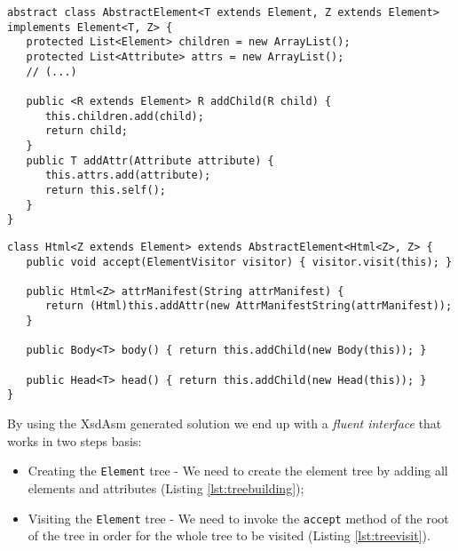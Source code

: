 \bigskip


\begin{minipage}{\linewidth}
\begin{lstlisting}[caption={AbstractElement generated by XsdAsm},label={lst:abstractelementasm}]
abstract class AbstractElement<T extends Element, Z extends Element> implements Element<T, Z> {
   protected List<Element> children = new ArrayList();
   protected List<Attribute> attrs = new ArrayList();
   // (...)

   public <R extends Element> R addChild(R child) {
      this.children.add(child);
      return child;
   }
   public T addAttr(Attribute attribute) {
      this.attrs.add(attribute);
      return this.self();
   }
}
\end{lstlisting}
\end{minipage}

\bigskip


\begin{minipage}{\linewidth}
\begin{lstlisting}[caption={Html class generated by XsdAsm},label={lst:htmlasm}]
class Html<Z extends Element> extends AbstractElement<Html<Z>, Z> {
   public void accept(ElementVisitor visitor) { visitor.visit(this); }
   
   public Html<Z> attrManifest(String attrManifest) {
      return (Html)this.addAttr(new AttrManifestString(attrManifest));
   }
   
   public Body<T> body() { return this.addChild(new Body(this)); }
   
   public Head<T> head() { return this.addChild(new Head(this)); }
}
\end{lstlisting}
\end{minipage}

\noindent
By using the XsdAsm generated solution we end up with a \textit{fluent interface} that works in two steps basis:

\begin{itemize}  
	\item Creating the \texttt{Element} tree - We need to create the element tree by adding all elements and attributes (Listing \ref{lst:treebuilding});
	\item Visiting the \texttt{Element} tree - We need to invoke the \texttt{accept} method of the root of the tree in order for the whole tree to be visited (Listing \ref{lst:treevisit}).
\end{itemize}

